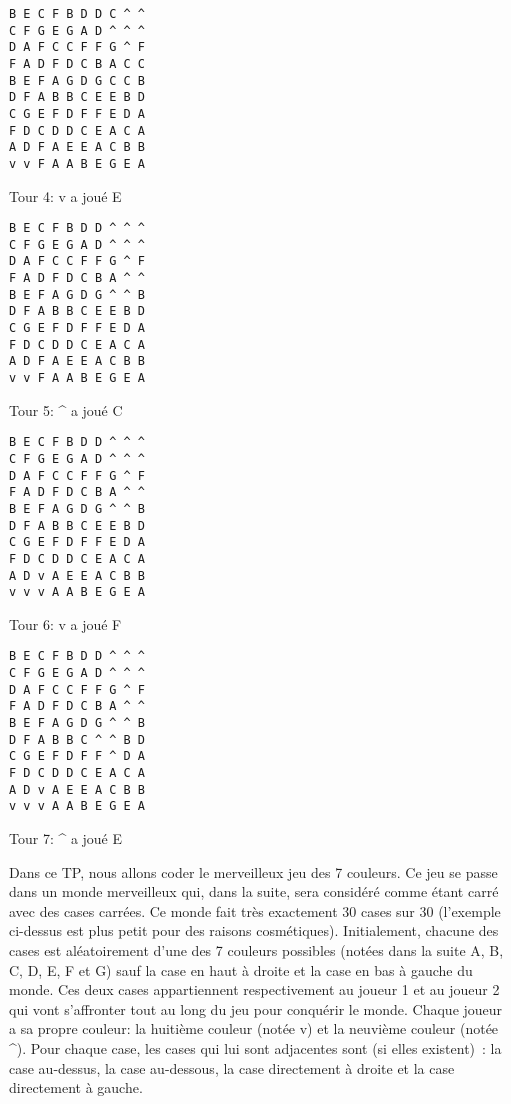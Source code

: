 \documentclass[a4paper,10pt]{article}
\begin{document}
\smallskip
\noindent
  \begin{minipage}[c]{.22\linewidth}
    \begin{lstlisting}
B E C F B D D C ^ ^ 
C F G E G A D ^ ^ ^ 
D A F C C F F G ^ F 
F A D F D C B A C C 
B E F A G D G C C B 
D F A B B C E E B D 
C G E F D F F E D A 
F D C D D C E A C A 
A D F A E E A C B B 
v v F A A B E G E A 
\end{lstlisting}
    \centerline{Tour 4: v a joué E}
  \end{minipage}\hfill
  \begin{minipage}[c]{.22\linewidth}
    \begin{lstlisting}
B E C F B D D ^ ^ ^ 
C F G E G A D ^ ^ ^ 
D A F C C F F G ^ F 
F A D F D C B A ^ ^ 
B E F A G D G ^ ^ B 
D F A B B C E E B D 
C G E F D F F E D A 
F D C D D C E A C A 
A D F A E E A C B B 
v v F A A B E G E A 
    \end{lstlisting}
    \centerline{Tour 5: \^{} a joué C}
  \end{minipage}\hfill
  \begin{minipage}[c]{.22\linewidth}
    \begin{lstlisting}
B E C F B D D ^ ^ ^ 
C F G E G A D ^ ^ ^ 
D A F C C F F G ^ F 
F A D F D C B A ^ ^ 
B E F A G D G ^ ^ B 
D F A B B C E E B D 
C G E F D F F E D A 
F D C D D C E A C A 
A D v A E E A C B B 
v v v A A B E G E A 
    \end{lstlisting}
    \centerline{Tour 6: v a joué F}
  \end{minipage}\hfill
  \begin{minipage}[c]{.22\linewidth}
    \begin{lstlisting}
B E C F B D D ^ ^ ^ 
C F G E G A D ^ ^ ^ 
D A F C C F F G ^ F 
F A D F D C B A ^ ^ 
B E F A G D G ^ ^ B 
D F A B B C ^ ^ B D 
C G E F D F F ^ D A 
F D C D D C E A C A 
A D v A E E A C B B 
v v v A A B E G E A 
    \end{lstlisting}
    \centerline{Tour 7: \^{} a joué E}
  \end{minipage}

\bigskip

Dans ce TP, nous allons coder le merveilleux jeu des 7 couleurs. Ce
jeu se passe dans un monde merveilleux qui, dans la suite, sera
considéré comme étant carré avec des cases carrées. Ce monde fait très
exactement 30 cases sur 30 (l'exemple ci-dessus est plus petit pour
des raisons cosmétiques). Initialement, chacune des cases est
aléatoirement d'une des 7 couleurs possibles (notées dans la suite A,
B, C, D, E, F et G) sauf la case en haut à droite et la case en bas à
gauche du monde. Ces deux cases appartiennent respectivement au joueur
1 et au joueur 2 qui vont s'affronter tout au long du jeu pour
conquérir le monde. Chaque joueur a sa propre couleur: la huitième
couleur (notée v) et la neuvième couleur (notée \^{}). Pour chaque
case, les cases qui lui sont adjacentes sont (si elles existent)~: la
case au-dessus, la case au-dessous, la case directement à droite et la
case directement à gauche.
\end{document}
